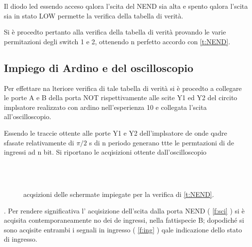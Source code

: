 	Il diodo led  essendo acceso qalora l'scita del NEND sia alta
	e spento qalora  l'scita sia in stato LOW
	permette la verifica della tabella di verità.
	
	Si è procedto pertanto alla verifica della tabella di verità provando le varie permitazioni degli switch 1 e 2, ottenendo n perfetto accordo con \tablename{ \ref{t:NEND}}.
\subsection{Impiego di Ardino e del oscilloscopio}\label{sez:ard}
	Per effettare na lteriore verifica di tale tabella di verità 
	si è procedto a collegare le porte A e B della porta NOT rispettivamente alle 
	scite Y1 ed Y2 del circito implsatore realizzato con ardino nell'esperienza 10
	e collegata l'scita all'oscilloscopio.
	
	Essendo le traccie ottente alle porte Y1 e Y2 dell'implsatore de onde qadre 
	sfasate relativamente di $\pi/2$ s di n periodo generano ttte le permtazioni di de ingressi ad n bit.
	Si riportano le acqisizioni ottente dall'oscilloscopio
	\begin{figure}[hb]
		\centering
		\\
	\\
	\caption{acqsizioni delle schermate impiegate per la verifica di \tablename{ \ref{t:NEND}}.}
	\label{f:osci}
\end{figure}.
	Per rendere significativa l' acqisizione dell'scita dalla porta NEND ( \figurename{ \ref{f:sci}} ) si è acqisita contemporaneamente no dei de ingressi, nella fattispecie B; dopodiché si sono acqisite entrambi i segnali  in ingresso (\figurename{ \ref{f:ing}} ) qale indicazione dello stato di ingresso.
	

